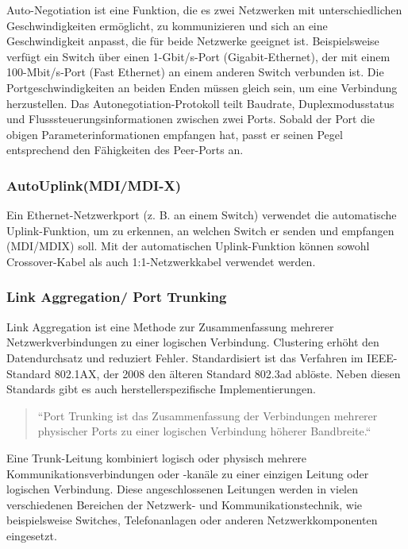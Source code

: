         Auto-Negotiation ist eine Funktion, die es zwei Netzwerken mit unterschiedlichen Geschwindigkeiten
        ermöglicht, zu kommunizieren und sich an eine Geschwindigkeit anpasst, 
        die für beide Netzwerke geeignet ist. 
        Beispielsweise verfügt ein Switch über einen 1-Gbit/s-Port (Gigabit-Ethernet), 
        der mit einem 100-Mbit/s-Port (Fast Ethernet) an einem anderen Switch verbunden ist. 
        Die Portgeschwindigkeiten an beiden Enden müssen gleich sein, um eine Verbindung herzustellen. 
        Das Autonegotiation-Protokoll teilt Baudrate, Duplexmodusstatus und Flusssteuerungsinformationen zwischen zwei Ports. 
        Sobald der Port die obigen Parameterinformationen empfangen hat, 
        passt er seinen Pegel entsprechend den Fähigkeiten des Peer-Ports an.

        \subsubsection{AutoUplink(MDI/MDI-X)}

        Ein Ethernet-Netzwerkport (z. B. an einem Switch) verwendet die automatische Uplink-Funktion, um zu erkennen, 
        an welchen Switch er senden und empfangen (MDI/MDIX) soll. 
        Mit der automatischen Uplink-Funktion können sowohl Crossover-Kabel 
        als auch 1:1-Netzwerkkabel verwendet werden.

        \subsubsection{Link Aggregation/ Port Trunking}
        Link Aggregation ist eine Methode zur Zusammenfassung mehrerer Netzwerkverbindungen 
        zu einer logischen Verbindung. Clustering erhöht den Datendurchsatz und reduziert Fehler. 
        Standardisiert ist das Verfahren im IEEE-Standard 802.1AX, der 2008 den älteren Standard 
        802.3ad ablöste. Neben diesen Standards gibt es auch herstellerspezifische Implementierungen.

        \begin{quote}
            ``Port Trunking ist das Zusammenfassung der Verbindungen mehrerer physischer Ports zu einer 
            logischen Verbindung höherer Bandbreite.`` \cite*{portTrunking}
        \end{quote}
        Eine Trunk-Leitung kombiniert logisch oder physisch mehrere Kommunikationsverbindungen oder -kanäle zu 
        einer einzigen Leitung oder logischen Verbindung. Diese angeschlossenen Leitungen werden in 
        vielen verschiedenen Bereichen der Netzwerk- und Kommunikationstechnik, wie beispielsweise 
        Switches, Telefonanlagen oder anderen Netzwerkkomponenten eingesetzt.

